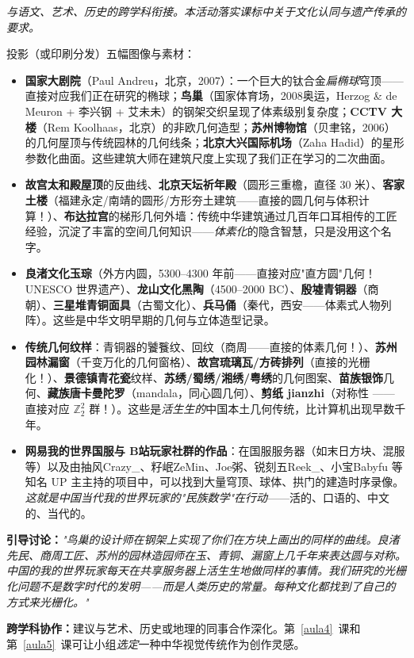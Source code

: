 \documentclass[12pt,a4paper]{scrartcl}
\newcommand{\acc}[1]{\textcolor{accent}{\textbf{#1}}}
\newcommand{\tempo}[1]{\textnormal{\footnotesize\color{bg!90!white}\textsf{#1}}}
\begin{document}
\begin{huodong}[3.4 —— 与中华视觉文化遗产对话 \quad\tempo{10 分钟}]\label{at:34}
\emph{与语文、艺术、历史的跨学科衔接。本活动落实课标中关于文化认同与遗产传承的要求。}

投影（或印刷分发）五幅图像与素材：

\begin{itemize}[leftmargin=1.3em,itemsep=0.2em,topsep=0.3em,nosep]
  \item \acc{国家大剧院}（Paul Andreu，北京，2007）：一个巨大的钛合金\emph{扁椭球}穹顶——直接对应我们正在研究的椭球；\acc{鸟巢}（国家体育场，2008奥运，Herzog \& de Meuron + 李兴钢 + 艾未未）的钢架交织呈现了体素级别复杂度；\acc{CCTV 大楼}（Rem Koolhaas，北京）的非欧几何造型；\acc{苏州博物馆}（贝聿铭，2006）的几何屋顶与传统园林的几何线条；\acc{北京大兴国际机场}（Zaha Hadid）的星形参数化曲面。这些建筑大师在建筑尺度上实现了我们正在学习的二次曲面。

  \item \acc{故宫太和殿屋顶}的反曲线、\acc{北京天坛祈年殿}（圆形三重檐，直径 30 米）、\acc{客家土楼}（福建永定/南靖的圆形/方形夯土建筑——直接的圆几何与体积计算！）、\acc{布达拉宫}的梯形几何外墙：传统中华建筑通过几百年口耳相传的工匠经验，沉淀了丰富的空间几何知识——\emph{体素化}的隐含智慧，只是没用这个名字。

  \item \acc{良渚文化玉琮}（外方内圆，5300--4300 年前——直接对应"直方圆"几何！UNESCO 世界遗产）、\acc{龙山文化黑陶}（4500--2000 BC）、\acc{殷墟青铜器}（商朝）、\acc{三星堆青铜面具}（古蜀文化）、\acc{兵马俑}（秦代，西安——体素式人物列阵）。这些是中华文明早期的几何与立体造型记录。

  \item \acc{传统几何纹样}：青铜器的饕餮纹、回纹（商周——直接的体素几何！）、\acc{苏州园林漏窗}（千变万化的几何窗格）、\acc{故宫琉璃瓦/方砖排列}（直接的光栅化！）、\acc{景德镇青花瓷}纹样、\acc{苏绣/蜀绣/湘绣/粤绣}的几何图案、\acc{苗族银饰}几何、\acc{藏族唐卡曼陀罗}（mandala，同心圆几何）、\acc{剪纸 jianzhi}（对称性 —— 直接对应 $\mathbb{Z}_2^2$ 群！）。这些是\emph{活生生的}中国本土几何传统，比计算机出现早数千年。

  \item \acc{网易我的世界国服与 B站玩家社群的作品}：在国服服务器（如末日方块、混服等）以及由抽风Crazy\_、籽岷ZeMin、Joe粥、锐刻五Reek\_、小宝Babyfu 等知名 UP 主主持的项目中，可以找到大量穹顶、球体、拱门的建造时序录像。\emph{这就是中国当代我的世界玩家的"民族数学"在行动}——活的、口语的、中文的、当代的。
\end{itemize}

\textbf{引导讨论：}\emph{"鸟巢的设计师在钢架上实现了你们在方块上画出的同样的曲线。良渚先民、商周工匠、苏州的园林造园师在玉、青铜、漏窗上几千年来表达圆与对称。中国的我的世界玩家每天在共享服务器上活生生地做同样的事情。我们研究的光栅化问题不是数字时代的发明——而是人类历史的常量。每种文化都找到了自己的方式来\emph{光栅化}。"}

\textbf{跨学科协作：}建议与艺术、历史或地理的同事合作深化。第~\ref{aula4}~课和第~\ref{aula5}~课可让小组\emph{选定}一种中华视觉传统作为创作灵感。
\end{huodong}
\end{document}
